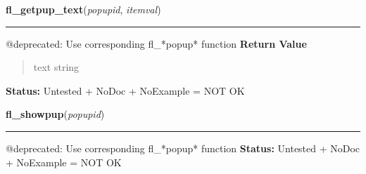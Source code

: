     \label{xformslib:deprecated:fl_getpup_text}

    \vspace{0.5ex}

\hspace{.8\funcindent}\begin{boxedminipage}{\funcwidth}

    \raggedright \textbf{fl\_getpup\_text}(\textit{popupid}, \textit{itemval})

    \vspace{-1.5ex}

    \rule{\textwidth}{0.5\fboxrule}
\setlength{\parskip}{2ex}

@deprecated: Use corresponding fl\_*popup* function
\setlength{\parskip}{1ex}
      \textbf{Return Value}
    \vspace{-1ex}

      \begin{quote}

text string
      \end{quote}

\textbf{Status:} 
Untested + NoDoc + NoExample = NOT OK


    \end{boxedminipage}

    \label{xformslib:deprecated:fl_showpup}

    \vspace{0.5ex}

\hspace{.8\funcindent}\begin{boxedminipage}{\funcwidth}

    \raggedright \textbf{fl\_showpup}(\textit{popupid})

    \vspace{-1.5ex}

    \rule{\textwidth}{0.5\fboxrule}
\setlength{\parskip}{2ex}

@deprecated: Use corresponding fl\_*popup* function
\setlength{\parskip}{1ex}
\textbf{Status:} 
Untested + NoDoc + NoExample = NOT OK


    \end{boxedminipage}

    \label{xformslib:deprecated:fl_hidepup}

